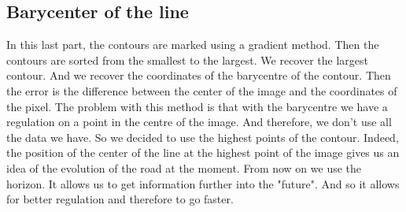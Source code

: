\subsection{Barycenter of the line}
In this last part, the contours are marked using a gradient method. Then the contours are sorted from the smallest to the largest.
We recover the largest contour.
And we recover the coordinates of the barycentre of the contour.
Then the error is the difference between the center of the image and the coordinates of the pixel.
The problem with this method is that with the barycentre we have a regulation on a point in the centre of the image. And therefore, we don't use all the data we have.
So we decided to use the highest points of the contour.
Indeed, the position of the center of the line at the highest point of the image gives us an idea of the evolution of the road at the moment. From now on we use the horizon. It allows us to get information further into the "future". And so it allows for better regulation and therefore to go faster.
